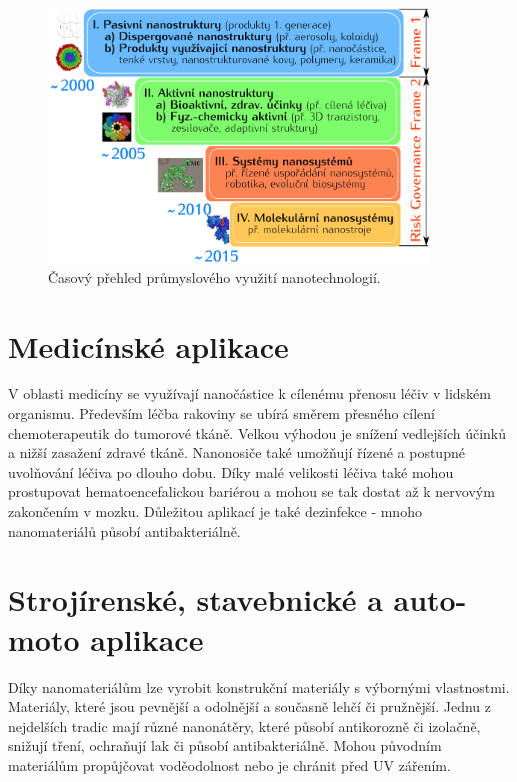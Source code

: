     \begin{figure}
        \centering
        \includegraphics[width=0.9\textwidth]{pictures/casova_osa_generaci_nanomaterialu.png}
        \caption{Časový přehled průmyslového využití nanotechnologií. \cite{filipova2012}}
        \label{fig:casova_osa_nanocastic}
    \end{figure}

\section{Medicínské aplikace}

    V oblasti medicíny se využívají nanočástice k cílenému přenosu léčiv v lidském organismu. Především léčba rakoviny se ubírá směrem přesného cílení chemoterapeutik do tumorové tkáně. Velkou výhodou je snížení vedlejších účinků a nižší zasažení zdravé tkáně. \cite{nanoprotech2016} Nanonosiče také umožňují řízené a postupné uvolňování léčiva po dlouho dobu. Díky malé velikosti léčiva také mohou prostupovat hematoencefalickou bariérou a mohou se tak dostat až k nervovým zakončením v mozku. Důležitou aplikací je také dezinfekce - mnoho nanomateriálů působí antibakteriálně. \cite{nohavica2011}


\section{Strojírenské, stavebnické a auto-moto aplikace}

    Díky nanomateriálům lze vyrobit konstrukční materiály s výbornými vlastnostmi. Materiály, které jsou pevnější a odolnější a současně lehčí či pružnější. Jednu z nejdelších tradic mají různé nanonátěry, které působí antikorozně či izolačně, snižují tření, ochraňují lak či působí antibakteriálně. Mohou původním materiálům propůjčovat voděodolnost nebo je chránit před UV zářením. \cite{nanoprotech2016,nasiol}

